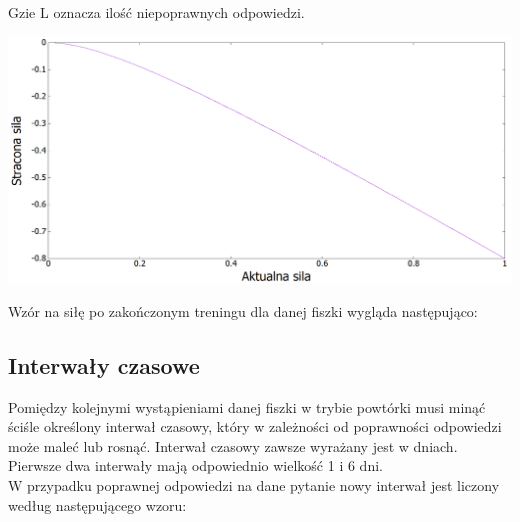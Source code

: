 Gzie L oznacza ilość niepoprawnych odpowiedzi.

\begin{center}
	\centering
	\includegraphics[width=\textwidth]{images/LossStrength.png}
\end{center}

Wzór na siłę po zakończonym treningu dla danej fiszki wygląda następująco:\\


\subsection{Interwały czasowe}

Pomiędzy kolejnymi wystąpieniami danej fiszki w trybie powtórki musi minąć ściśle określony interwał czasowy, który w zależności od poprawności odpowiedzi może maleć lub rosnąć. 
Interwał czasowy zawsze wyrażany jest w dniach. Pierwsze dwa interwały mają odpowiednio wielkość 1 i 6 dni.
\\
W przypadku poprawnej odpowiedzi na dane pytanie nowy interwał jest liczony według następującego wzoru:



